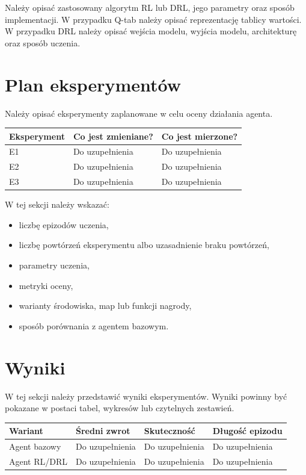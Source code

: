 \documentclass[12pt]{article}
\begin{document}
Należy opisać zastosowany algorytm RL lub DRL, jego parametry oraz sposób implementacji. W przypadku Q-tab należy opisać reprezentację tablicy wartości. W przypadku DRL należy opisać wejścia modelu, wyjścia modelu, architekturę oraz sposób uczenia.

\section{Plan eksperymentów}

Należy opisać eksperymenty zaplanowane w celu oceny działania agenta.

\begin{center}
\begin{tabular}{p{}p{}p{}}
\toprule
Eksperyment & Co jest zmieniane? & Co jest mierzone? \\
\midrule
E1 & Do uzupełnienia & Do uzupełnienia \\
E2 & Do uzupełnienia & Do uzupełnienia \\
E3 & Do uzupełnienia & Do uzupełnienia \\
\bottomrule
\end{tabular}
\end{center}

W tej sekcji należy wskazać:
\begin{itemize}
    \item liczbę epizodów uczenia,
    \item liczbę powtórzeń eksperymentu albo uzasadnienie braku powtórzeń,
    \item parametry uczenia,
    \item metryki oceny,
    \item warianty środowiska, map lub funkcji nagrody,
    \item sposób porównania z agentem bazowym.
\end{itemize}

\section{Wyniki}

W tej sekcji należy przedstawić wyniki eksperymentów. Wyniki powinny być pokazane w postaci tabel, wykresów lub czytelnych zestawień.

\begin{center}
\begin{tabular}{p{}p{}p{}p{}}
\toprule
Wariant & Średni zwrot & Skuteczność & Długość epizodu \\
\midrule
Agent bazowy & Do uzupełnienia & Do uzupełnienia & Do uzupełnienia \\
Agent RL/DRL & Do uzupełnienia & Do uzupełnienia & Do uzupełnienia \\
\bottomrule
\end{tabular}
\end{center}
\end{document}
